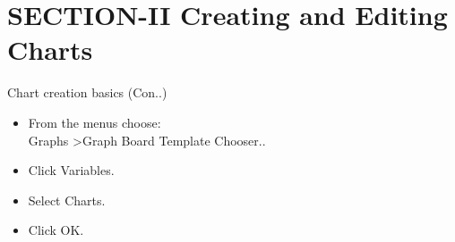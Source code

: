 \section{SECTION-II Creating and Editing Charts}
\begin{frame}[t]{Chart creation basics (Con..)}
	\begin{itemize}
		\item From the menus choose:\\
		Graphs \textgreater Graph Board Template Chooser..
		\item Click Variables.
		\item Select Charts.
		\item Click OK.
		
	\end{itemize}
\end{frame}

